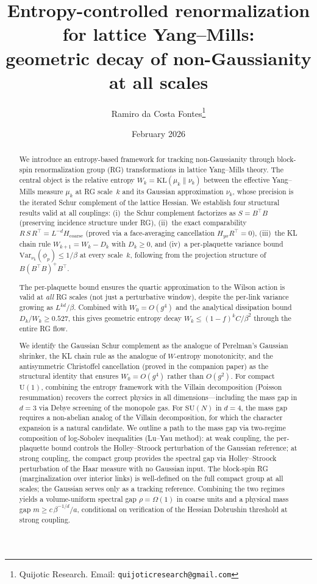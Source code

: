 \documentclass[11pt]{article}
\title{Entropy-controlled renormalization for lattice Yang--Mills: \\
geometric decay of non-Gaussianity at all scales}
\author{Ramiro da Costa Fontes\thanks{Quijotic Research.
Email: \texttt{quijoticresearch@gmail.com}}}
\date{February 2026}
\theoremstyle{definition}
\newcommand{\KL}{\mathrm{KL}}
\newcommand{\Var}{\mathrm{Var}}
\begin{document}
\maketitle

\begin{abstract}
We introduce an entropy-based framework for tracking non-Gaussianity 
through block-spin renormalization group (RG) transformations in 
lattice Yang--Mills theory.  The central object is the relative entropy 
$W_k = \KL(\mu_k \| \nu_k)$ between the effective Yang--Mills measure 
$\mu_k$ at RG scale~$k$ and its Gaussian approximation $\nu_k$, 
whose precision is the iterated Schur complement of the lattice 
Hessian.  We establish four structural results valid at all couplings: 
(i)~the Schur complement factorizes as $S = B^\top B$ (preserving 
incidence structure under RG), (ii)~the exact comparability 
$R\,S\,R^\top = L^{-d} H_{\mathrm{coarse}}$ (proved via a 
face-averaging cancellation $H_{yx}R^\top = 0$), (iii)~the 
KL chain rule $W_{k+1} = W_k - D_k$ with $D_k \geq 0$, and 
(iv)~a per-plaquette variance bound 
$\Var_{\nu_k}(\phi_p) \leq 1/\beta$ at every scale~$k$, 
following from the projection structure of $B(B^\top B)^+ B^\top$.

The per-plaquette bound ensures the quartic approximation to the 
Wilson action is valid at \emph{all} RG scales (not just a 
perturbative window), despite the per-link variance growing as 
$L^{kd}/\beta$.  Combined with $W_0 = O(g^4)$ and the analytical 
dissipation bound $D_k/W_k \geq 0.527$, this gives geometric 
entropy decay $W_k \leq (1 - f)^k C/\beta^2$ through the entire 
RG flow.

We identify the Gaussian Schur complement as the analogue of 
Perelman's Gaussian shrinker, the KL chain rule as the analogue 
of $W$-entropy monotonicity, and the antisymmetric Christoffel 
cancellation (proved in the companion paper) as the structural 
identity that ensures $W_0 = O(g^4)$ rather than $O(g^2)$.  
For compact $\mathrm{U}(1)$, combining the entropy framework with 
the Villain decomposition (Poisson resummation) recovers the 
correct physics in all dimensions---including the mass gap in $d = 3$ 
via Debye screening of the monopole gas.  For $\mathrm{SU}(N)$ in 
$d = 4$, the mass gap requires a non-abelian analog of the Villain 
decomposition, for which the character expansion is a natural candidate.  
We outline a path to the mass gap via two-regime 
composition of log-Sobolev inequalities (Lu--Yau method): 
at weak coupling, the per-plaquette bound controls the 
Holley--Stroock perturbation of the Gaussian reference; at 
strong coupling, the compact group provides the spectral gap 
via Holley--Stroock perturbation of the Haar measure with no 
Gaussian input.  The block-spin RG (marginalization over interior 
links) is well-defined on the full compact group at all scales; 
the Gaussian serves only as a tracking reference.  Combining 
the two regimes yields a volume-uniform spectral gap 
$\rho = \Omega(1)$ in coarse units and a physical mass gap 
$m \geq c\,\beta^{-1/d}/a$, conditional on verification of 
the Hessian Dobrushin threshold at strong coupling.
\end{abstract}
\end{document}
